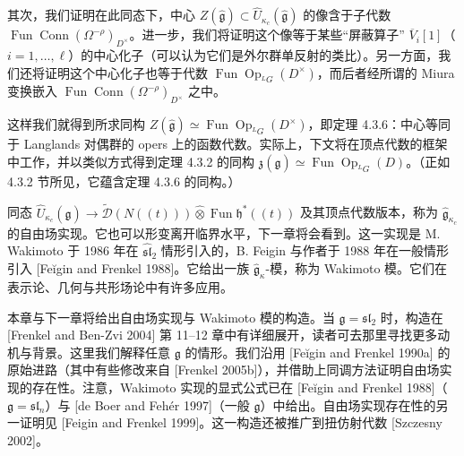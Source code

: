 其次，我们证明在此同态下，中心 $Z(\hat{\mathfrak{g}})\subset\widehat{U}_{\kappa_c}(\hat{\mathfrak{g}})$ 的像含于子代数 $\operatorname{Fun}\operatorname{Conn}(\Omega^{-\rho})_{D^\times}$。进一步，我们将证明这个像等于某些“屏蔽算子” $\overline{V}_i[1]$（$i=1,\ldots,\ell$）的中心化子（可以认为它们是外尔群单反射的类比）。另一方面，我们还将证明这个中心化子也等于代数 $\operatorname{Fun}\operatorname{Op}_{{}^LG}(D^\times)$，而后者经所谓的 Miura 变换嵌入 $\operatorname{Fun}\operatorname{Conn}(\Omega^{-\rho})_{D^\times}$ 之中。

这样我们就得到所求同构 $Z(\hat{\mathfrak{g}})\simeq\operatorname{Fun}\operatorname{Op}_{{}^LG}(D^\times)$，即定理 4.3.6：中心等同于 Langlands 对偶群的 opers 上的函数代数。实际上，下文将在顶点代数的框架中工作，并以类似方式得到定理 4.3.2 的同构 $\mathfrak{z}(\hat{\mathfrak{g}})\simeq\operatorname{Fun}\operatorname{Op}_{{}^LG}(D)$。（正如 4.3.2 节所见，它蕴含定理 4.3.6 的同构。）

同态 $\widehat{U}_{\kappa_c}(\hat{\mathfrak{g}})\to\widetilde{\mathcal{D}}(N((t)))\widehat{\otimes}\operatorname{Fun}\mathfrak{h}^*((t))$ 及其顶点代数版本，称为 $\hat{\mathfrak{g}}_{\kappa_c}$ 的自由场实现。它也可以形变离开临界水平，下一章将会看到。这一实现是 M. Wakimoto 于 1986 年在 $\widehat{\mathfrak{sl}}_2$ 情形引入的，B. Feigin 与作者于 1988 年在一般情形引入 [Feĭgin and Frenkel 1988]。它给出一族 $\hat{\mathfrak{g}}_\kappa$-模，称为 Wakimoto 模。它们在表示论、几何与共形场论中有许多应用。



本章与下一章将给出自由场实现与 Wakimoto 模的构造。当 $\mathfrak{g}=\mathfrak{sl}_2$ 时，构造在 [Frenkel and Ben-Zvi 2004] 第 11–12 章中有详细展开，读者可去那里寻找更多动机与背景。这里我们解释任意 $\mathfrak{g}$ 的情形。我们沿用 [Feĭgin and Frenkel 1990a] 的原始进路（其中有些修改来自 [Frenkel 2005b]），并借助上同调方法证明自由场实现的存在性。注意，Wakimoto 实现的显式公式已在 [Feĭgin and Frenkel 1988]（$\mathfrak{g}=\mathfrak{sl}_n$）与 [de Boer and Fehér 1997]（一般 $\mathfrak{g}$）中给出。自由场实现存在性的另一证明见 [Feigin and Frenkel 1999]。这一构造还被推广到扭仿射代数 [Szczesny 2002]。

